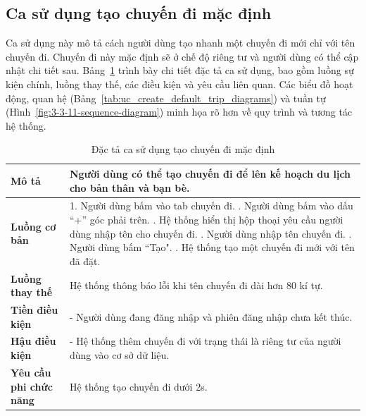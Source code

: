 \subsection{Ca sử dụng tạo chuyến đi mặc định}
\noindent Ca sử dụng này mô tả cách người dùng tạo nhanh một chuyến đi mới chỉ với tên chuyến đi. Chuyến đi này mặc định sẽ ở chế độ riêng tư và người dùng có thể cập nhật chi tiết sau. Bảng~\ref{tab:uc_create_default_trip_spec} trình bày chi tiết đặc tả ca sử dụng, bao gồm luồng sự kiện chính, luồng thay thế, các điều kiện và yêu cầu liên quan. Các biểu đồ hoạt động, quan hệ (Bảng~\ref{tab:uc_create_default_trip_diagrams}) và tuần tự (Hình~\ref{fig:3-3-11-sequence-diagram}) minh họa rõ hơn về quy trình và tương tác hệ thống.

\begin{longtable}{| p{4cm} | p{\dimexpr\linewidth-4cm-4\tabcolsep} |} %
    \caption{Đặc tả ca sử dụng tạo chuyến đi mặc định} %
    \label{tab:uc_create_default_trip_spec} \\ %

    \hline
    \textbf{Mô tả} & Người dùng có thể tạo chuyến đi để lên kế hoạch du lịch cho bản thân và bạn bè. \\
    \hline
    \endfirsthead %



    \hline %
    \endlastfoot

    \textbf{Luồng cơ bản} & 1. Người dùng bấm vào tab chuyến đi. \newline
                           2. Người dùng bấm vào dấu ``+'' góc phải trên. \newline
                           3. Hệ thống hiển thị hộp thoại yêu cầu người dùng nhập tên cho chuyến đi. \newline
                           4. Người dùng nhập tên chuyến đi. \newline
                           5. Người dùng bấm ``Tạo". \newline
                           6. Hệ thống tạo một chuyến đi mới với tên đã đặt. \\
    \hline
    \textbf{Luồng thay thế} & Hệ thống thông báo lỗi khi tên chuyến đi dài hơn 80 kí tự. \\
    \hline
    \textbf{Tiền điều kiện} & - Người dùng đang đăng nhập và phiên đăng nhập chưa kết thúc. \\
    \hline
    \textbf{Hậu điều kiện} & - Hệ thống thêm chuyến đi với trạng thái là riêng tư của người dùng vào cơ sở dữ liệu. \\
    \hline
    \textbf{Yêu cầu phi chức năng} & Hệ thống tạo chuyến đi dưới 2s. \\

\end{longtable}



